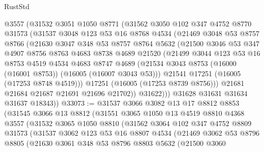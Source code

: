 \begin{lexlean}{RustStd}
\begin{coremodule}
        @3557
        (@31532
          @3051
          @1050
          @8771
          (@31562
            @3050
            @102
            @347
            @4752
            @8770
            @31573
            (@31537
              @3048
              @123
              @53
              @16
              @8768
              @4534
              (@21469
                @3048
                @53
                @8757
                @8766
                (@21630
                  @3047
                  @348
                  @53
                  @8757
                  @8764
                  @5632
                  (@21500
                    @3046
                    @53
                    @347
                    @4907
                    @8756
                    @8763
                    @4683
                    @8738
                    @4689
                    @21520
                    (@21499
                      @3044
                      @123
                      @53
                      @16
                      @8753
                      @4519
                      @4534
                      @4683
                      @8747
                      @4689
                      (@21534 @3043 @8753 (@16000 (@16001 @8753)) (@16005 (@16007 @3043 @53)))
                      @21541
                      @17251
                      (@16005 (@17253 @8748 @4519)))
                    @17251
                    (@16005 (@17253 @8739 @8756)))
                  @21681
                  @21684
                  @21687
                  @21691
                  @21696
                  @21702))
              @31622)))
        @31628
        @31631
        @31634
        @31637
        @18343))
@33073 := @31537
    @3066
    @3082
    @13
    @17
    @8812
    @8853
    (@31545
      @3066
      @13
      @8812
      (@31551
        @3065
        @1050
        @13
        @4519
        @8810
        @4368
        @3557
        (@31532
          @3065
          @1050
          @8810
          (@31562
            @3064
            @102
            @347
            @4752
            @8809
            @31573
            (@31537
              @3062
              @123
              @53
              @16
              @8807
              @4534
              (@21469
                @3062
                @53
                @8796
                @8805
                (@21630
                  @3061
                  @348
                  @53
                  @8796
                  @8803
                  @5632
                  (@21500
                    @3060

\end{coremodule}
\end{lexlean}
